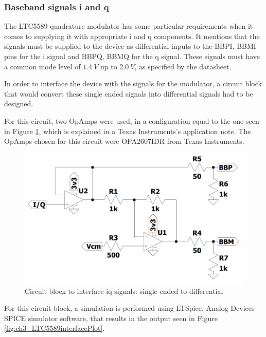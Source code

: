 \subsubsection{Baseband signals \ac{i} and \ac{q}}
\par The LTC5589 quadrature modulator has some particular requirements when it comes to supplying it with appropriate \ac{i} and \ac{q} components. It mentions that the signals must be supplied to the device as differential inputs to the BBPI, BBMI pins for the \ac{i} signal and BBPQ, BBMQ for the \ac{q} signal. These signals must have a common mode level of $1.4\:\si{V}$ up to $2.0\:\si{V}$, as specified by the datasheet.

\par In order to interface the device with the signals for the modulator, a circuit block that would convert these single ended signals into differential signals had to be designed. 

\par For this circuit, two OpAmps were used, in a configuration equal to the one seen in Figure \ref{fig:ch3_LTC5589interfaceCirc.png}, which is explained in a Texas Instruments's application note. The OpAmps chosen for this circuit were OPA2607IDR from Texas Instruments.

\begin{figure}[H]
    \vspace*{0cm}
    \centering
    \includegraphics[width=0.7\linewidth]{figs/ch3_LTC5589interfaceCirc.png}
    \caption{Circuit block to interface \ac{iq} signals: single ended to differential}
    \label{fig:ch3_LTC5589interfaceCirc.png}
\end{figure}

\par For this circuit block, a simulation is performed using LTSpice, Analog Devices SPICE simulator software, that results in the output seen in Figure \ref{fig:ch3_LTC5589interfacePlot}.

